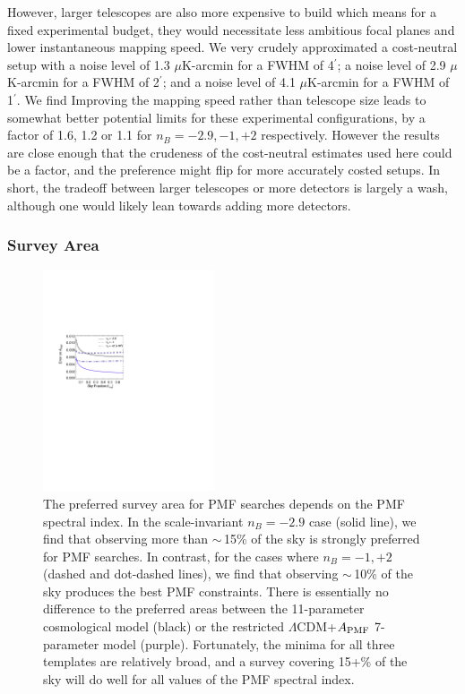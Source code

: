 \documentclass[apj]{emulateapj}
\newcommand{\apmf}{\ensuremath{A_{\rm PMF}}}
\newcommand{\lcdm}{\ensuremath{\Lambda}CDM}
\newcommand{\ukarcmin}{\ensuremath{\mu}K-arcmin}
\begin{document}
However, larger telescopes are also more expensive to build which means for a fixed experimental budget, they would necessitate less ambitious focal planes and lower instantaneous mapping speed. 
We very crudely approximated a cost-neutral setup with a noise level of 1.3 \ukarcmin{} for a FWHM of 4$^\prime$; a noise level of 2.9 \ukarcmin{} for a FWHM of 2$^\prime$; and a noise level of 4.1 \ukarcmin{} for a FWHM of 1$^\prime$. 
We find 
Improving the mapping speed rather than telescope size leads to somewhat better potential limits for these experimental configurations, by a factor of 1.6, 1.2 or 1.1 for $n_B = -2.9, -1, +2$ respectively. 
However the results are close enough that the crudeness of the cost-neutral estimates used here could be a factor, and the preference might flip for more accurately costed setups. 
In short,  the tradeoff between larger telescopes or more detectors is largely a wash, although one would likely lean towards adding more detectors. 

\subsubsection{Survey Area}

\begin{figure}[htb]\centering
\includegraphics[width=0.45\textwidth,clip,trim={1.5cm 12.5cm 11cm 7.5cm}]{pmf_area.pdf}
  \caption[Area dependence]{
  The preferred survey area for PMF searches depends on the PMF spectral index. 
    In the scale-invariant $n_B = -2.9$ case (solid line), we find that observing more than $\sim$\,15\% of the sky is strongly preferred for PMF searches. 
 In contrast, for the cases where $n_B = -1, +2$ (dashed and dot-dashed lines), we find that observing  $\sim$\,10\% of the sky produces the best PMF constraints. 
   There is essentially no difference to the preferred areas between the 11-parameter cosmological model (black) or the restricted \lcdm{}+\apmf{} 7-parameter model (purple). 
     Fortunately, the minima for all three templates are relatively broad, and a survey covering 15+\% of the sky will do well for all values of the PMF spectral index. 
    \label{fig:area}
  }
\end{figure}
\end{document}
